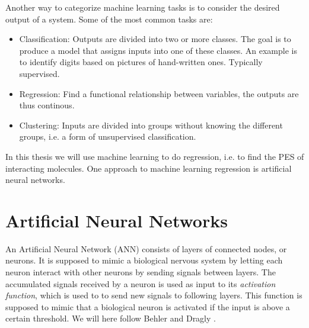 \documentclass[twoside,english]{uiofysmaster}
\begin{document}
Another way to categorize machine learning tasks is to consider the desired output of a system.
Some of the most common tasks are:
\begin{itemize}
 \item Classification: Outputs are divided into two or more classes. The goal is to 
 produce a model that assigns inputs into one of these classes. An example is to identify
 digits based on pictures of hand-written ones. Typically supervised. 
 \item Regression: Find a functional relationship between variables, the outputs are thus continous. 
 \item Clustering: Inputs are divided into groups without knowing the different groups, i.e. a form of unsupervised classification.  
\end{itemize}
In this thesis we will use machine learning to do regression, i.e. to find the PES of interacting molecules.
One approach to machine learning regression is artificial neural networks. 

\section{Artificial Neural Networks} \label{sec:ANN}
An Artificial Neural Network (ANN) consists of layers of connected nodes, or neurons. 
It is supposed to mimic a biological nervous system by letting each neuron interact with other neurons
by sending signals between layers. The accumulated signals received by a neuron is used as input to its 
\textit{activation function}, which is used to to send new signals to following layers. This function is supposed to mimic that 
a biological neuron is activated if the input is above a certain threshold. We will here follow 
Behler \cite{Behler11general} and Dragly \cite{Dragly14}.
\end{document}
